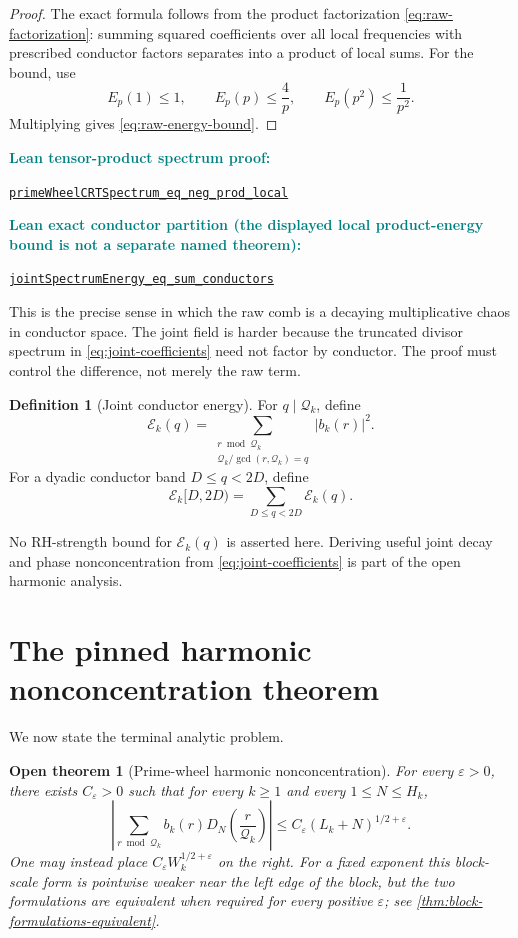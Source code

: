 \documentclass[11pt]{article}
\newtheorem{conjecture}[theorem]{Open theorem}
\theoremstyle{definition}
\newtheorem{definition}[theorem]{Definition}
\newcommand{\leanxref}[3]{%
  \par\smallskip
  {\small\noindent\textcolor{teal}{\textbf{#1:}}\par
  \noindent\href{#3}{\nolinkurl{#2}}\par}
  \smallskip
}
\begin{document}
\begin{proof}
The exact formula follows from the product factorization \eqref{eq:raw-factorization}: summing squared coefficients over all local frequencies with prescribed conductor factors separates into a product of local sums.  For the bound, use
\[
E_p(1)\le1,
\qquad
E_p(p)\le\frac4p,
\qquad
E_p(p^2)\le\frac1{p^2}.
\]
Multiplying gives \eqref{eq:raw-energy-bound}.
\end{proof}
\leanxref{Lean tensor-product spectrum proof}{primeWheelCRTSpectrum_eq_neg_prod_local}{https://github.com/OVVO-Financial/prime-wheel-mobius/blob/main/formalization/RHLean/Analysis/PrimeWheelCompleteSpectrum.lean}
\leanxref{Lean exact conductor partition (the displayed local product-energy bound is not a separate named theorem)}{jointSpectrumEnergy_eq_sum_conductors}{https://github.com/OVVO-Financial/prime-wheel-mobius/blob/main/formalization/RHLean/Analysis/PrimeWheelHarmonicCriterion.lean}

This is the precise sense in which the raw comb is a decaying multiplicative chaos in conductor space.  The joint field is harder because the truncated divisor spectrum in \eqref{eq:joint-coefficients} need not factor by conductor.  The proof must control the difference, not merely the raw term.

\begin{definition}[Joint conductor energy]\label{def:joint-energy}
For $q\mid\mathcal Q_k$, define
\[
\mathcal E_k(q)
=
\sum_{\substack{r\bmod\mathcal Q_k\\
\mathcal Q_k/\gcd(r,\mathcal Q_k)=q}}
|b_k(r)|^2.
\]
For a dyadic conductor band $D\le q<2D$, define
\[
\mathcal E_k[D,2D)=\sum_{D\le q<2D}\mathcal E_k(q).
\]
\end{definition}

No RH-strength bound for $\mathcal E_k(q)$ is asserted here.  Deriving useful joint decay and phase nonconcentration from \eqref{eq:joint-coefficients} is part of the open harmonic analysis.

\section{The pinned harmonic nonconcentration theorem}

We now state the terminal analytic problem.

\begin{conjecture}[Prime-wheel harmonic nonconcentration]\label{open:HN}
For every $\varepsilon>0$, there exists $C_{\varepsilon}>0$ such that for every $k\ge1$ and every $1\le N\le H_k$,
\begin{equation}\label{eq:HN}
\boxed{
\left|
\sum_{r\bmod\mathcal Q_k}
 b_k(r)D_N\!\left(\frac r{\mathcal Q_k}\right)
\right|
\le C_{\varepsilon}(L_k+N)^{1/2+\varepsilon}.}
\end{equation}
One may instead place $C_{\varepsilon}W_k^{1/2+\varepsilon}$ on the right.  For a fixed exponent this block-scale form is pointwise weaker near the left edge of the block, but the two formulations are equivalent when required for every positive $\varepsilon$; see \cref{thm:block-formulations-equivalent}.
\end{conjecture}
\end{document}
